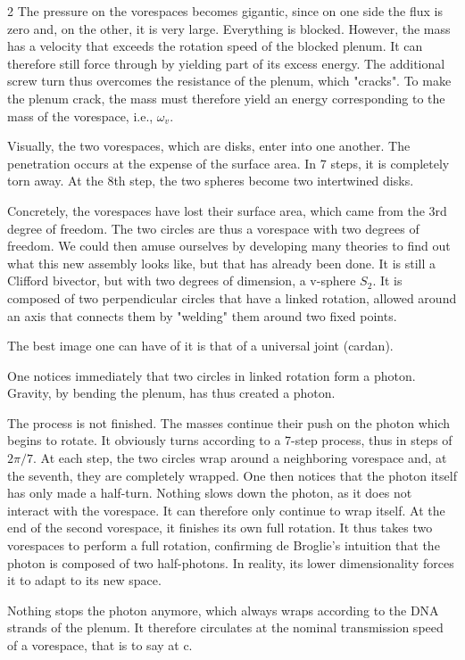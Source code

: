 \begin{multicols}{2}
	The pressure on the vorespaces becomes gigantic, since on one side the 
	flux is zero and, on the other, it is very large. Everything is blocked. 
	However, the mass has a velocity that exceeds the rotation speed of the 
	blocked plenum. It can therefore still force through by yielding part of its 
	excess energy. The additional screw turn thus overcomes the resistance of 
	the plenum, which "cracks". To make the plenum crack, the mass must 
	therefore yield an energy corresponding to the mass of the vorespace, i.e., 
	$\omega_v$.
	
	Visually, the two vorespaces, which are disks, enter into one another. The 
	penetration occurs at the expense of the surface area. In 7 steps, it is 
	completely torn away. At the 8th step, the two spheres become two 
	intertwined disks.
	
	Concretely, the vorespaces have lost their surface area, which came from 
	the 3rd degree of freedom. The two circles are thus a vorespace with two 
	degrees of freedom. We could then amuse ourselves by developing many 
	theories to find out what this new assembly looks like, but that has 
	already been done. It is still a Clifford bivector, but with two degrees of 
	dimension, a v-sphere $S_2$. It is composed of two perpendicular circles 
	that have a linked rotation, allowed around an axis that connects them by 
	"welding" them around two fixed points.
	
	The best image one can have of it is that of a universal joint (cardan).
	
	One notices immediately that two circles in linked rotation form a photon. 
	Gravity, by bending the plenum, has thus created a photon.
	
	The process is not finished. The masses continue their push on the photon 
	which begins to rotate. It obviously turns according to a 7-step 
	process, thus in steps of $2\pi/7$. At each step, the two circles wrap 
	around a neighboring vorespace and, at the seventh, they are completely 
	wrapped. One then notices that the photon itself has only made a half-turn. 
	Nothing slows down the photon, as it does not interact with the 
	vorespace. It can therefore only continue to wrap itself. At the end of the 
	second vorespace, it finishes its own full rotation. It thus takes two 
	vorespaces to perform a full rotation, confirming de Broglie's intuition 
	that the photon is composed of two half-photons. In reality, its lower 
	dimensionality forces it to adapt to its new space.
	
	Nothing stops the photon anymore, which always wraps according to the DNA 
	strands of the plenum. It therefore circulates at the nominal transmission 
	speed of a vorespace, that is to say at c.
	

\end{multicols}
